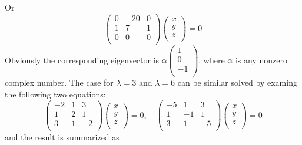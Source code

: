 \documentclass{article}
\begin{document}
Or
$$
\left( \begin{array}{ccc}
 0 & -20 & 0 \\
 1 & 7 & 1 \\
 0 & 0 & 0 \\
\end{array} \right)\left( \begin{array}{c}
 x \\
 y \\
 z \\
\end{array} \right) = 0
$$
Obviously the corresponding eigenvector is $\alpha\left( \begin{array}{c}
     1 \\
     0 \\
     -1 \\
\end{array} \right)$, where $\alpha$ is any nonzero complex number.
The case for $\lambda=3$ and $\lambda=6$ can be similar solved by
examing the following two equations:
$$
\left( \begin{array}{ccc}
 -2 & 1 & 3 \\
 1 & 2 & 1 \\
 3 & 1 & -2 \\
\end{array} \right)\left( \begin{array}{c}
 x \\
 y \\
 z \\
\end{array} \right) = 0, \quad
\left( \begin{array}{ccc}
 -5 & 1 & 3 \\
 1 & -1 & 1 \\
 3 & 1 & -5 \\
\end{array} \right)\left( \begin{array}{c}
 x \\
 y \\
 z \\
\end{array} \right) = 0
$$
and the result is summarized as
\end{document}
